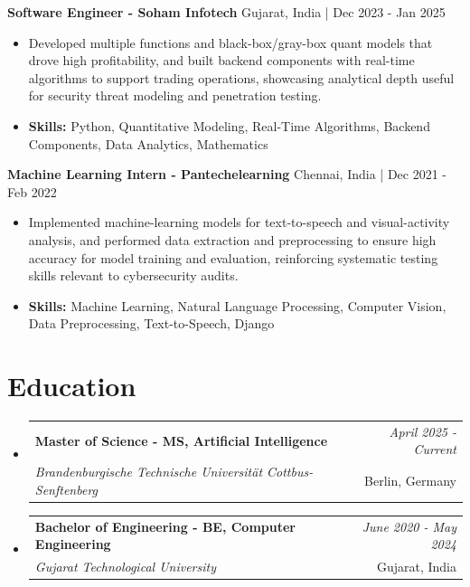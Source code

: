 \documentclass[a4paper,11pt]{article}
\makeatletter
\newcommand{\resumeSubheading}[4]{
\vspace{0.5mm}\item
    \begin{tabular*}{\linewidth}[t]{l@{\extracolsep{\fill}}r}
        \textbf{#1} & \textit{\footnotesize{#4}} \\
        \textit{\footnotesize{#3}} &  \footnotesize{#2}\\
    \end{tabular*}
    \vspace{-2.4mm}
}
\makeatother
\begin{document}
\vspace{1mm}
  \textbf{Software Engineer - Soham Infotech} \hfill Gujarat, India | Dec 2023 - Jan 2025
\vspace{-1.5mm} %
\begin{itemize}
  \item Developed multiple functions and black-box/gray-box quant models that drove high profitability, and built backend components with real-time algorithms to support trading operations, showcasing analytical depth useful for security threat modeling and penetration testing.

\vspace{-2mm}
  \item \textbf{Skills:} Python, Quantitative Modeling, Real-Time Algorithms, Backend Components, Data Analytics, Mathematics
\end{itemize}

\vspace{1mm}
  \textbf{Machine Learning Intern - Pantechelearning} \hfill Chennai, India | Dec 2021 - Feb 2022
\vspace{-1.5mm} %
\begin{itemize}
  \item Implemented machine-learning models for text-to-speech and visual-activity analysis, and performed data extraction and preprocessing to ensure high accuracy for model training and evaluation, reinforcing systematic testing skills relevant to cybersecurity audits.
\vspace{-2mm}
  \item \textbf{Skills:} Machine Learning, Natural Language Processing, Computer Vision, Data Preprocessing, Text-to-Speech, Django
\end{itemize}\section{\textbf{Education}}
\vspace{-0.4mm}

\begin{itemize}[leftmargin=0.15in, label={}]
\resumeSubheading
{Master of Science - MS, Artificial Intelligence }{Berlin, Germany}
{Brandenburgische Technische Universität Cottbus-Senftenberg  }{April 2025 - Current}

\vspace{1.0mm} %
\resumeSubheading
{Bachelor of Engineering - BE, Computer Engineering  }{Gujarat, India}
{Gujarat Technological University }{June 2020 - May 2024}

\end{itemize}
\end{document}

